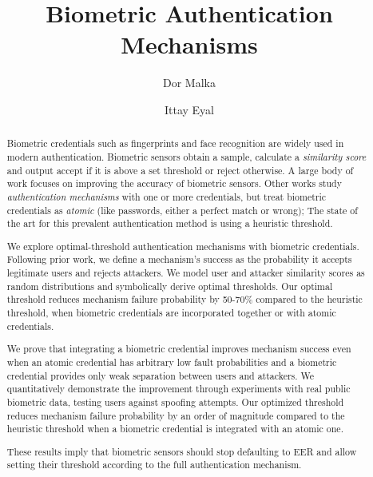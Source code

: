 \documentclass[sigconf]{acmart}
\title{Biometric Authentication Mechanisms}
\author{Dor Malka}
\affiliation{%
  \institution{Technion}
  \country{Haifa, Israel}
}
\author{Ittay Eyal}
\affiliation{%
  \institution{Technion}
  \country{Haifa, Israel}
}
\begin{document}
\begin{abstract}
Biometric credentials such as fingerprints and face recognition are widely used in modern authentication. Biometric sensors obtain a sample, calculate a \emph{similarity score} and output accept if it is above a set threshold or reject otherwise. A large body of work focuses on improving the accuracy of biometric sensors. Other works study \emph{authentication mechanisms} with one or more credentials, but treat biometric credentials as \emph{atomic} (like passwords, either a perfect match or wrong); The state of the art for this prevalent authentication method is using a heuristic threshold.

We explore optimal-threshold authentication mechanisms with biometric credentials. Following prior work, we define a mechanism's success as the probability it accepts legitimate users and rejects attackers. We model user and attacker similarity scores as random distributions and symbolically derive optimal thresholds. Our optimal threshold reduces mechanism failure probability by 50-70\% compared to the heuristic threshold, when biometric credentials are incorporated together or with atomic credentials.

We prove that integrating a biometric credential improves mechanism success even when an atomic credential has arbitrary low fault probabilities and a biometric credential provides only weak separation between users and attackers. We quantitatively demonstrate the improvement through experiments with real public biometric data, testing users against spoofing attempts. Our optimized threshold reduces mechanism failure probability by an order of magnitude compared to the heuristic threshold when a biometric credential is integrated with an atomic one.

These results imply that biometric sensors should stop defaulting to EER and allow setting their threshold according to the full authentication mechanism.
\end{abstract}

\maketitle
\end{document}
